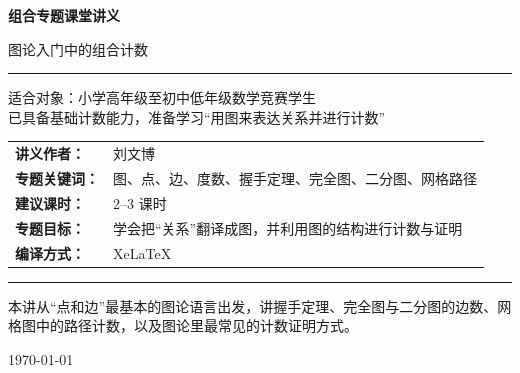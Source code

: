 \documentclass[11pt,a4paper,fontset=fandol]{ctexart}
\theoremstyle{formaltheorem}
\theoremstyle{formalexample}
\begin{document}
\thispagestyle{empty}
\begin{titlepage}
\centering
\vspace*{0.9cm}

\begin{tcolorbox}[
  enhanced,
  width=0.92\textwidth,
  colback=white,
  colframe=mainblue,
  boxrule=1pt,
  arc=0mm,
  left=6mm,
  right=6mm,
  top=8mm,
  bottom=8mm
]
\centering

{\fontsize{24}{30}\selectfont\bfseries 组合专题课堂讲义\par}
\vspace{0.7cm}
{\fontsize{17}{22}\selectfont 图论入门中的组合计数\par}

\vspace{1.1cm}
\color{rulegray}\rule{0.72\textwidth}{0.7pt}\par
\vspace{1cm}

\begin{tcolorbox}[colback=lightblue,colframe=mainblue,width=0.82\textwidth,boxrule=1pt]
\centering
{\Large 适合对象：小学高年级至初中低年级数学竞赛学生}\\[0.4em]
{\large 已具备基础计数能力，准备学习“用图来表达关系并进行计数”}
\end{tcolorbox}

\vspace{1.2cm}

\renewcommand{\arraystretch}{1.42}
\begin{tabular}{>{\bfseries}p{3.5cm}p{8cm}}
讲义作者： & 刘文博 \\
专题关键词： & 图、点、边、度数、握手定理、完全图、二分图、网格路径 \\
建议课时： & 2--3 课时 \\
专题目标： & 学会把“关系”翻译成图，并利用图的结构进行计数与证明 \\
编译方式： & XeLaTeX \\
\end{tabular}

\vspace{1.2cm}
\color{rulegray}\rule{0.72\textwidth}{0.7pt}\par
\vspace{0.8cm}

{\normalsize 本讲从“点和边”最基本的图论语言出发，讲握手定理、完全图与二分图的边数、网格图中的路径计数，以及图论里最常见的计数证明方式。\par}

\vspace{0.5cm}
{\large \today\par}
\end{tcolorbox}
\end{titlepage}
\end{document}
